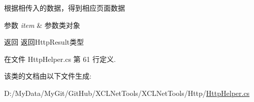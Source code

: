 根据相传入的数据，得到相应页面数据 


\begin{DoxyParams}{参数}
{\em item} & 参数类对象\\
\hline
\end{DoxyParams}
\begin{DoxyReturn}{返回}
返回\-Http\-Result类型
\end{DoxyReturn}


在文件 Http\-Helper.\-cs 第 61 行定义.



该类的文档由以下文件生成\-:\begin{DoxyCompactItemize}
\item 
D\-:/\-My\-Data/\-My\-Git/\-Git\-Hub/\-X\-C\-L\-Net\-Tools/\-X\-C\-L\-Net\-Tools/\-Http/\hyperlink{_http_helper_8cs}{Http\-Helper.\-cs}\end{DoxyCompactItemize}
